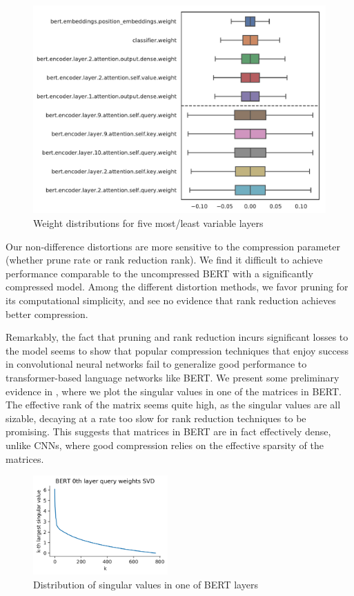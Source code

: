 \documentclass[10pt]{article}
\begin{document}
\begin{figure}[htb]
\centering
\includegraphics[width=.48\textwidth]{../figs/value_by_layer.pdf}
\caption{Weight distributions for five most/least variable layers}
\label{fig:weightsbylayer}
\end{figure}

Our non-difference distortions are more sensitive to the compression parameter
(whether prune rate or rank reduction rank). We find it difficult to achieve performance
comparable to the uncompressed BERT with a significantly compressed model. Among
the different distortion methods, we favor pruning for its computational
simplicity, and see no evidence that rank reduction achieves better compression.

Remarkably, the fact that pruning and rank reduction incurs significant
losses to the
model seems to show that popular compression techniques that enjoy success
in convolutional neural networks fail to generalize good performance to
transformer-based language networks like BERT. We present some preliminary
evidence in , where we plot the singular values
in one of the matrices in BERT. The effective rank of the matrix seems
quite high, as the singular values are all sizable, decaying at a rate too
slow for rank reduction techniques to be promising. This suggests that
matrices in BERT are in fact effectively dense, unlike CNNs, where
good compression relies on the effective sparsity of the matrices. 
\begin{figure}[tb]
    \centering
    \includegraphics[width=0.46\textwidth]
    {../figs/svd-singular-vals-distribution.png}
    \caption{Distribution of singular values in one of BERT layers}
    \label{fig:singular-values}
\end{figure}
\end{document}
